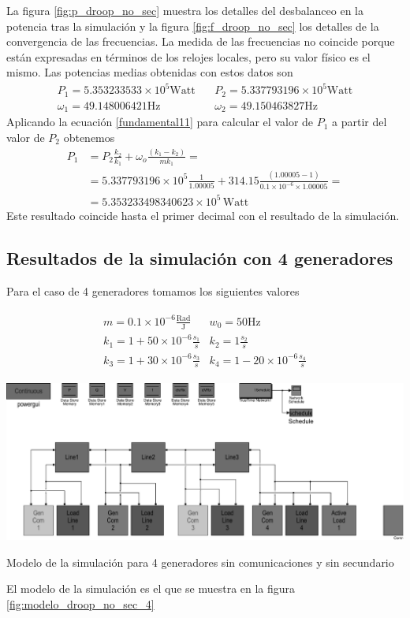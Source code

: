 \documentclass{tufte-handout}
\begin{document}
La figura \ref{fig:p_droop_no_sec} muestra los detalles del desbalanceo en la potencia tras la simulación y la figura \ref{fig:f_droop_no_sec} los detalles de la convergencia de las frecuencias. La medida de las frecuencias no coincide porque están expresadas en términos de los relojes locales, pero su valor físico es el mismo.
Las potencias medias obtenidas con estos datos son
\begin{align}
    P_1=5.353233533\times10^5 \text{Watt} &\, &  P_2=5.337793196\times10^5 \text{Watt}\\
    \omega_1=49.148006421 \text{Hz} &\, & \omega_2=49.150463827\text{Hz}
\end{align}
Aplicando la ecuación \ref{fundamental11} para calcular el valor de $P_1$ a partir del valor de $P_2$ obtenemos
\begin{align}
    P_1&=P_2\frac{k_2}{k_1}+\omega_o\frac{(k_1-k_2)}{mk_1}=\\
       &=5.337793196\times10^5\frac{1}{1.00005}+314.15\frac{(1.00005-1)}{0.1\times10^{-6}\times1.00005}=\\
       &=5.353233498340623\times10^5\,\text{Watt}
\end{align}
Este resultado coincide hasta el primer decimal con el resultado de la simulación.

\subsection{Resultados de la simulación con 4 generadores}
Para el caso de 4 generadores tomamos los siguientes valores

 \begin{align}
     \begin{matrix}
         m=0.1\times10^{-6}\frac{\text{Rad}}{\text{J}} & w_0=50\text{Hz}\\
         k_1=1+50\times 10^{-6}\frac{s_1}{s} & k_2=1\frac{s_2}{s}\\
         k_3=1+30\times 10^{-6} \frac{s_3}{s}& k_4=1-20\times10^{-6}\frac{s_4}{s} 
     \end{matrix}
 \end{align}
\begin{marginfigure}%
  \includegraphics[width=\linewidth]{modelo_no_comm_no_sec_4_nod}
  \caption{Modelo de la simulación para 4 generadores sin comunicaciones y sin secundario}
  \label{fig:modelo_droop_no_sec_4}
\end{marginfigure}
El modelo de la simulación es el que se muestra en la figura \ref{fig:modelo_droop_no_sec_4}
\end{document}
